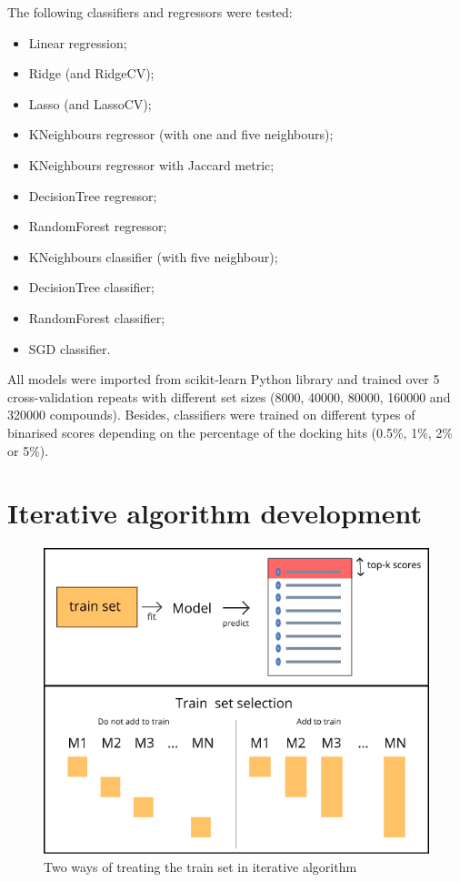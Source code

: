 The following classifiers and regressors were tested:
\begin{itemize}
    \item Linear regression;
    \item Ridge (and RidgeCV);
    \item Lasso (and LassoCV);
    \item KNeighbours regressor (with one and five neighbours);
    \item KNeighbours regressor with Jaccard metric;
    \item DecisionTree regressor;
    \item RandomForest regressor;
    \item KNeighbours classifier (with five neighbour);
    \item DecisionTree classifier;
    \item RandomForest classifier;
    \item SGD classifier.
\end{itemize}

All models were imported from scikit-learn Python library and trained over 5 cross-validation repeats with different set sizes (8000, 40000, 80000, 160000 and 320000 compounds).
Besides, classifiers were trained on different types of binarised scores depending on the percentage of the docking hits (0.5\%, 1\%, 2\% or 5\%).


\section{Iterative algorithm development}

\begin{figure}
    \centering
    \includegraphics[scale=0.72]{Images/image1.png}
    \caption{Two ways of treating the train set in iterative algorithm}
    \label{TrainSetSelection}
\end{figure}

